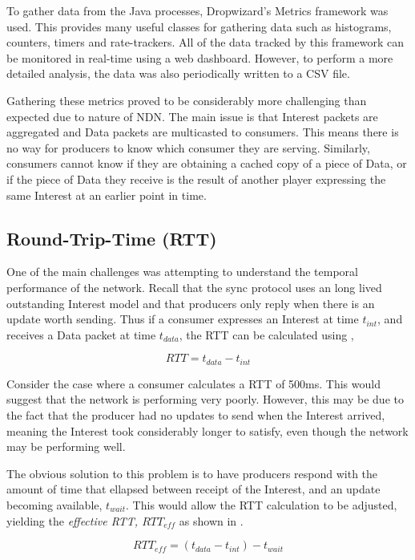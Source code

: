 To gather data from the \game{} Java processes, Dropwizard's Metrics framework \cite{dropwizard-metrics} was used. This provides many useful classes for gathering data such as histograms, counters, timers and rate-trackers. All of the data tracked by this framework can be monitored in real-time using a web dashboard. However, to perform a more detailed analysis, the data was also periodically written to a CSV file.


Gathering these metrics proved to be considerably more challenging than expected due to nature of NDN. The main issue is that Interest packets are aggregated and Data packets are multicasted to consumers. This means there is no way for producers to know which consumer they are serving. Similarly, consumers cannot know if they are obtaining a cached copy of a piece of Data, or if the piece of Data they receive is the result of another player expressing the same Interest at an earlier point in time. 

\subsection{Round-Trip-Time (RTT)}
One of the main challenges was attempting to understand the temporal performance of the network. Recall that the sync protocol uses an long lived outstanding Interest model and that producers only reply when there is an update worth sending. Thus if a consumer expresses an Interest at time $t_{int}$, and receives a Data packet at time $t_{data}$, the RTT can be calculated using ,

\begin{equation}\label{eq:impl:rtt}
    RTT = t_{data} - t_{int}
\end{equation}

Consider the case where a consumer calculates a RTT of 500ms. This would suggest that the network is performing very poorly. However, this may be due to the fact that the producer had no updates to send when the Interest arrived,  meaning the Interest took considerably longer to satisfy, even though the network may be performing well.

The obvious solution to this problem is to have producers respond with the amount of time that ellapsed between receipt of the Interest, and an update becoming available, $t_{wait}$. This would allow the RTT calculation to be adjusted, yielding the \textit{effective RTT, $RTT_{eff}$} as shown in .

\begin{equation}\label{eq:impl:rtt-eff}
    RTT_{eff} = (t_{data} - t_{int}) - t_{wait}
\end{equation}

